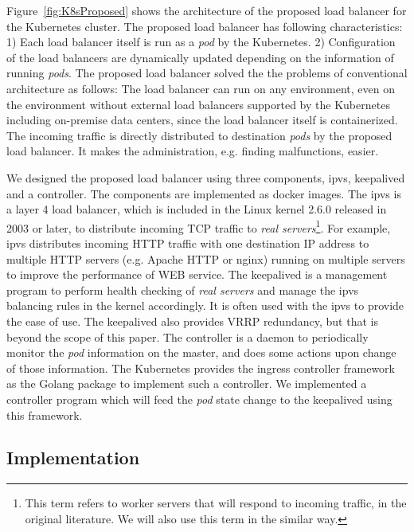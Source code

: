 Figure~\ref{fig:K8sProposed} shows the architecture of the proposed load balancer for the Kubernetes cluster. 
The proposed load balancer has following characteristics:
1) Each load balancer itself is run as a {\em pod} by the Kubernetes. 
2) Configuration of the load balancers are dynamically updated depending on the information of running {\em pods}.
The proposed load balancer solved the the problems of conventional architecture as follows:
The load balancer can run on any environment, even on the environment without external load balancers supported by the Kubernetes including on-premise data centers, since the load balancer itself is containerized. The incoming traffic is directly distributed to destination {\em pods} by the proposed load balancer. It makes the administration, e.g. finding malfunctions, easier.

We designed the proposed load balancer using three components, ipvs, keepalived and a controller. 
The components are implemented as docker images.
The ipvs is a layer 4 load balancer, which is included in the Linux kernel 2.6.0 released in 2003 or later, 
to distribute incoming TCP traffic to {\em real servers}\footnote{This term refers to worker servers that will respond to incoming traffic, 
in the original literature\cite{Zhang2000}. We will also use this term in the similar way.}\cite{Zhang2000}. 
For example, ipvs distributes incoming HTTP traffic with one destination IP address to multiple HTTP servers 
(e.g. Apache HTTP or nginx) running on multiple servers to improve the performance of WEB service.
The keepalived is a management program to perform health checking of {\em real servers}
and manage the ipvs balancing rules in the kernel accordingly.
It is often used with the ipvs to provide the ease of use.
The keepalived also provides VRRP\cite{hinden2004virtual} redundancy, but that is beyond the scope of this paper.
The controller is a daemon to periodically monitor the {\em pod} information on the master, 
and does some actions upon change of those information.
The Kubernetes provides the ingress controller framework as the Golang package to implement such a controller. 
We implemented a controller program which will feed the {\em pod} state change to the keepalived 
using this framework. 


\subsection{Implementation}\label{Implementation}

